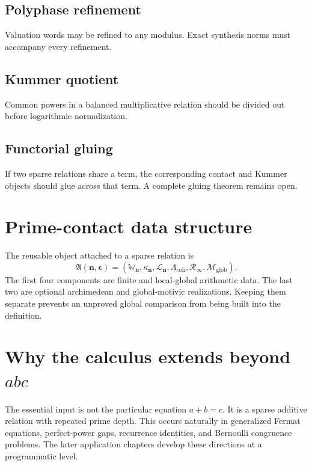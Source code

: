 \subsection{Polyphase refinement}
Valuation words may be refined to any modulus. Exact synthesis norms must accompany every refinement.

\subsection{Kummer quotient}
Common powers in a balanced multiplicative relation should be divided out before logarithmic normalization.

\subsection{Functorial gluing}
If two sparse relations share a term, the corresponding contact and Kummer objects should glue across that term. A complete gluing theorem remains open.

\section{Prime-contact data structure}
The reusable object attached to a sparse relation is
\[
 \boxed{
 \mathfrak A(\mathbf n,\boldsymbol\epsilon)
 =
 \left(
 \mathbb W_{\mathbf n},
 \kappa_{\mathbf n},
 \mathcal L_{\mathbf n},
 \Lambda_{\mathrm{coh}},
 \mathcal R_\infty,
 \mathcal M_{\mathrm{glob}}
 \right).
 }
\]
The first four components are finite and local-global arithmetic data. The last two are optional archimedean and global-motivic realizations. Keeping them separate prevents an unproved global comparison from being built into the definition.

\section{Why the calculus extends beyond \texorpdfstring{$abc$}{abc}}
The essential input is not the particular equation $a+b=c$. It is a sparse additive relation with repeated prime depth. This occurs naturally in generalized Fermat equations, perfect-power gaps, recurrence identities, and Bernoulli congruence problems. The later application chapters develop these directions at a programmatic level.
